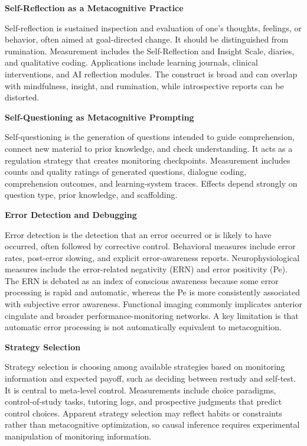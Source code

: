 \documentclass{book}
\providecommand{\ProjectDeepHeading}[2]{%
    \par\medskip\noindent\textbf{#2}\par\smallskip
}
\begin{document}
   \ProjectDeepHeading{7}{Self-Reflection as a Metacognitive Practice}

   Self-reflection is sustained inspection and evaluation of one's thoughts, feelings, or behavior, often aimed at goal-directed change. It should be distinguished from rumination. Measurement includes the Self-Reflection and Insight Scale, diaries, and qualitative coding. Applications include learning journals, clinical interventions, and AI reflection modules. The construct is broad and can overlap with mindfulness, insight, and rumination, while introspective reports can be distorted.

   \ProjectDeepHeading{7}{Self-Questioning as Metacognitive Prompting}

   Self-questioning is the generation of questions intended to guide comprehension, connect new material to prior knowledge, and check understanding. It acts as a regulation strategy that creates monitoring checkpoints. Measurement includes counts and quality ratings of generated questions, dialogue coding, comprehension outcomes, and learning-system traces. Effects depend strongly on question type, prior knowledge, and scaffolding.

   \ProjectDeepHeading{7}{Error Detection and Debugging}

   Error detection is the detection that an error occurred or is likely to have occurred, often followed by corrective control. Behavioral measures include error rates, post-error slowing, and explicit error-awareness reports. Neurophysiological measures include the error-related negativity (ERN) and error positivity (Pe). The ERN is debated as an index of conscious awareness because some error processing is rapid and automatic, whereas the Pe is more consistently associated with subjective error awareness. Functional imaging commonly implicates anterior cingulate and broader performance-monitoring networks. A key limitation is that automatic error processing is not automatically equivalent to metacognition.

   \ProjectDeepHeading{7}{Strategy Selection}

   Strategy selection is choosing among available strategies based on monitoring information and expected payoff, such as deciding between restudy and self-test. It is central to meta-level control. Measurements include choice paradigms, control-of-study tasks, tutoring logs, and prospective judgments that predict control choices. Apparent strategy selection may reflect habits or constraints rather than metacognitive optimization, so causal inference requires experimental manipulation of monitoring information.
\end{document}
